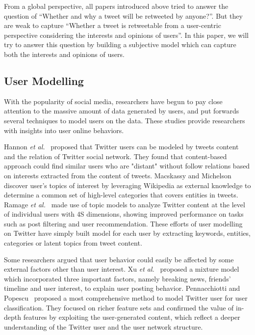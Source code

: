 \documentclass{acm_proc_article-sp}
\begin{document}
From a global perspective, all papers introduced above tried to answer the question of ``Whether and why a tweet will be retweeted by anyone?''. 
But they are weak to capture ``Whether a tweet is retweetable from a user-centric perspective considering the interests and opinions of users''. 
In this paper, we will try to answer this question by building a subjective model which can capture both the interests and opinions of users.

\subsection{User Modelling}
With the popularity of social media, researchers have begun to pay close attention to the massive amount of data generated by users, and put forwards several techniques to model users on the data. These studies provide researchers with insights into user online behaviors. 

Hannon \emph{et al.}~\cite{Hannon:2010} proposed that Twitter users can be modeled by tweets content and the relation of Twitter social network.
They found that content-based approach could find similar users who are "distant" without follow relations based on interests extracted from the content of tweets. 
Macskassy and Michelson~\cite{conf/icwsm/MacskassyM11} discover user's topics of interest by leveraging Wikipedia as external knowledge to determine a common set of high-level categories that covers entities in tweets. 
Ramage \emph{et al.}~\cite{RamageEtAl:10} made use of topic models to analyze Twitter content at the level of individual users with 4S dimensions, showing improved performance on tasks such as post filtering and user recommendation. 
These efforts of user modelling on Twitter have simply built model for each user by extracting keywords, entities, categories or latent topics from tweet content. 

Some researchers argued that user behavior could easily be affected by some external factors other than user interest.
Xu \emph{et al.}~\cite{Xu:2012MUP} proposed a mixture model which incorporated three important factors, namely breaking news, friends' timeline and user interest, to explain user posting behavior.
Pennacchiotti and Popescu~\cite{Pennacchiotti:icwsm11} proposed a most comprehensive method to model Twitter user for user classification. They focused on richer feature sets and confirmed the value of in-depth features by exploiting the user-generated content, which reflect a deeper understanding of the Twitter user and the user network structure.
\end{document}
